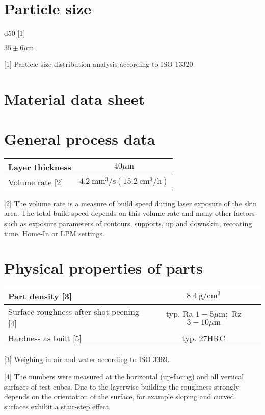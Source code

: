 \documentclass[10pt]{article}
\begin{document}
\section*{Particle size}
d50 [1]

$35 \pm 6 \mu \mathrm{m}$

[1] Particle size distribution analysis according to ISO 13320

\section*{Material data sheet}
\section*{General process data}
\begin{center}
\begin{tabular}{lc}
\hline
Layer thickness & $40 \mu \mathrm{m}$ \\
\hline
Volume rate [2] & $4.2 \mathrm{~mm}^{3} / \mathrm{s}\left(15.2 \mathrm{~cm}^{3} / \mathrm{h}\right)$ \\
\hline
\end{tabular}
\end{center}

[2] The volume rate is a measure of build speed during laser exposure of the skin area. The total build speed depends on this volume rate and many other factors such as exposure parameters of contours, supports, up and downskin, recoating time, Home-In or LPM settings.

\section*{Physical properties of parts}
\begin{center}
\begin{tabular}{lc}
\hline
Part density [3] & $8.4 \mathrm{~g} / \mathrm{cm}^{3}$ \\
\hline
Surface roughness after shot peening [4] & typ. Ra $1-5 \mu \mathrm{m} ;$ Rz $3-10 \mu \mathrm{m}$ \\
\hline
Hardness as built [5] & typ. $27 \mathrm{HRC}$ \\
\hline
\end{tabular}
\end{center}

[3] Weighing in air and water according to ISO 3369.

[4] The numbers were measured at the horizontal (up-facing) and all vertical surfaces of test cubes. Due to the layerwise building the roughness strongly depends on the orientation of the surface, for example sloping and curved surfaces exhibit a stair-step effect.
\end{document}
